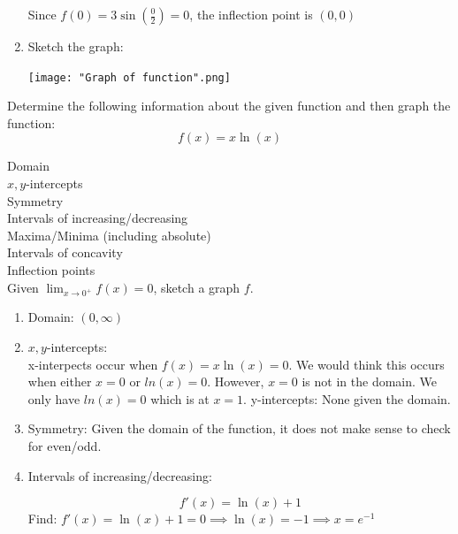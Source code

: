 \documentclass[nooutcomes,handout]{ximera}
\begin{document}
\begin{problem}
\begin{freeResponse}
\begin{enumerate}
            Since $f(0)=3\sin\left(\frac{0}{2}\right)=0$, the inflection point is $(0,0)$
            
            

   

  \item Sketch the graph: 
        \begin{image}
        \texttt{[image: "Graph of function".png]}
      \end{image}
  
  
\end{enumerate}
\end{freeResponse}
\end{problem}


\begin{problem}
  Determine the following information about the given function and then graph the function:
  \[
    f(x) = x\ln(x)
  \]

 Domain\\
  $x,y$-intercepts\\
  Symmetry\\
  Intervals of increasing/decreasing\\
  Maxima/Minima (including absolute)\\
  Intervals of concavity\\
  Inflection points\\
Given $\lim_{x \to 0^+}f(x)=0$, sketch a graph $f$.

\begin{freeResponse}
\begin{enumerate}


\item Domain: $(0,\infty)$

\item $x,y$-intercepts:\\
x-interpects occur when $f(x) = x\ln(x) =0$.  We would think this occurs when either $x=0$ or $ln(x)=0$.  However, $x=0$ is not in the domain.  We only have $ln(x)=0$ which is at $x=1$.
y-intercepts: None given the domain.


\item Symmetry: Given the domain of the function, it does not make sense to check for even/odd.

\item Intervals of increasing/decreasing:

$$f'(x)=\ln(x)+1$$
Find: $f'(x)=\ln(x)+1=0 \implies \ln(x)=-1 \implies x=e^{-1}$\\


\end{enumerate}
\end{freeResponse}
\end{problem}
\end{document}
